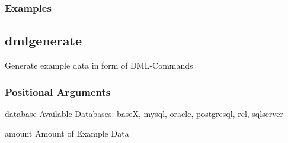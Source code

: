 \documentclass[letterpaper,10pt,english,openany,oneside]{sphinxmanual}
\begin{document}
\subsubsection{Examples}
\begin{sphinxVerbatim}[commandchars=\\\{\}]
        
\end{sphinxVerbatim}
\begin{sphinxVerbatim}[commandchars=\\\{\}]
           
\end{sphinxVerbatim}

\subsection{dmlgenerate}
\label{\detokenize{cmd_main:dmlgenerate}}
Generate example data in form of DML-Commands

\begin{sphinxVerbatim}[commandchars=\\\{\}]
  \PYG{p}{[}\PYG{p}{]} \PYG{p}{[} \PYG{p}{]} \PYG{p}{[} \PYG{p}{]} \PYG{p}{[}\PYG{p}{]} \PYG{p}{[}\PYG{p}{]}
                  \PYG{p}{[} \PYG{p}{]} \PYG{p}{[} \PYG{p}{]}
                   
\end{sphinxVerbatim}


\subsubsection{Positional Arguments}
\label{\detokenize{cmd_main:Positional Arguments_repeat1}}\begin{optionlist}{3cm}
\item [database]  
Available Databases: baseX, mysql, oracle, postgresql, rel, sqlserver
\item [amount]  
Amount of Example Data
\end{optionlist}
\end{document}
